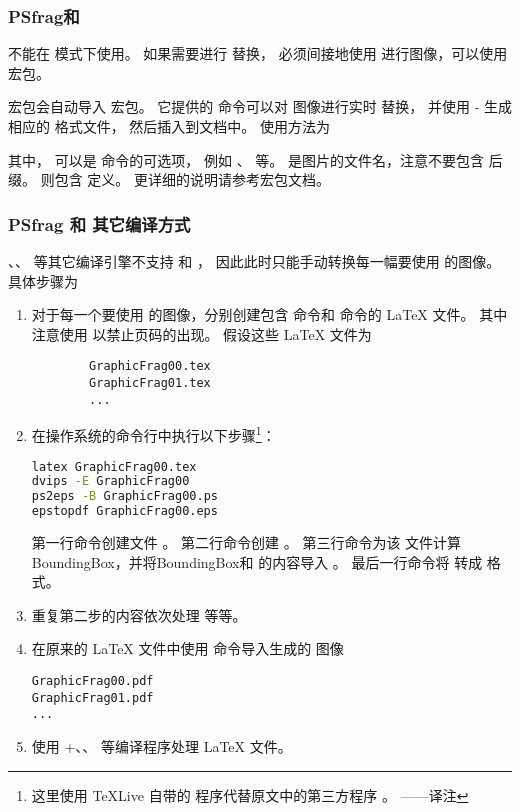 \subsubsection{PSfrag和 \pdfTeX{}}\label{sssec:psfrag-pdftex}
 不能在 \pdfTeX{} 模式下使用。
如果需要进行  替换，
必须间接地使用  进行图像，可以使用  宏包。

 宏包会自动导入  宏包。
它提供的  命令可以对  图像进行实时  替换，
并使用 - 生成相应的  格式文件，
然后插入到文档中。
使用方法为
\begin{center}
\end{center}
其中， 可以是  命令的可选项，
例如 、 等。
 是图片的文件名，注意不要包含  后缀。
 则包含  定义。
更详细的说明请参考宏包文档\cite{pstool-doc}。

\subsubsection{PSfrag 和 其它编译方式}\label{sssec:psfrag-otherdriver}
、\XeTeX{}、\LuaTeX{} 等其它编译引擎不支持  和 ，
因此此时只能手动转换每一幅要使用  的图像。
具体步骤为
\begin{enumerate}
	\item 对于每一个要使用  的图像，分别创建包含  命令和  命令的 \LaTeX{} 文件。
	其中注意使用  以禁止页码的出现。
	假设这些 \LaTeX{} 文件为
\begin{verbatim}
		GraphicFrag00.tex
		GraphicFrag01.tex
		...
\end{verbatim}
	\item 在操作系统的命令行中执行以下步骤\footnote{%
		这里使用 \TeX Live 自带的  程序代替原文中的第三方程序 。
		——译注}：
\begin{lstlisting}[language=bash]
latex GraphicFrag00.tex
dvips -E GraphicFrag00
ps2eps -B GraphicFrag00.ps
epstopdf GraphicFrag00.eps
\end{lstlisting}
	第一行命令创建文件 。
	第二行命令创建 。
	第三行命令为该  文件计算 BoundingBox，并将BoundingBox和  的内容导入 。
	最后一行命令将  转成  格式。
	\item 重复第二步的内容依次处理  等等。
	\item 在原来的 \LaTeX{} 文件中使用  命令导入生成的  图像
\begin{verbatim}
GraphicFrag00.pdf
GraphicFrag01.pdf
...
\end{verbatim}
	\item 使用 +、、 等编译程序处理 \LaTeX{} 文件。
\end{enumerate}


